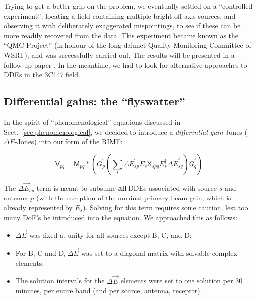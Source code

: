 \documentclass[]{aa}
\newcommand{\jones}[2]{\vec {#1}_{#2}}
\newcommand{\jonesT}[2]{\vec {#1}^\dagger_{#2}}
\newcommand{\coh}[2]{\mathsf{{#1}}_{{#2}}}
\begin{document}
Trying to get a better grip on the problem, we eventually settled on a ``controlled experiment'':
locating a field containing multiple bright off-axis sources, and observing it with deliberately exaggerated mispointings, to see if these can be more readily recovered from the data. This experiment became known as the ``QMC Project'' (in honour of the long-defunct Quality Monitoring Committee of WSRT), and was successfully carried out. The results will be presented in a follow-up paper \citep{QMC}. 
In the meantime, we had to look for alternative approaches to DDEs in the 3C147 field.

\subsection{Differential gains: the ``flyswatter''\label{sec:diffgains}}

In the spirit of ``phenomenological'' equations discussed in Sect.~\ref{sec:phenomenological}, we decided to introduce a {\em differential gain} Jones ($\Delta E$-Jones) into our form of the RIME:

\begin{equation}\label{eq:3C147:de}
\coh{V}{pq} = \coh{M}{pq} \ast \left ( \jones{G}{p} \left( \sum_s \Delta\jones{E}{sp} E_s \coh{X}{spq} E^{\dagger}_s \Delta\jonesT{E}{sq} \right)  \jonesT{G}{q} \right )
\end{equation}

The $\Delta\jones{E}{sp}$ term is meant to subsume {\bf all} DDEs associated with source $s$ and antenna $p$ (with the exception of the nominal primary beam gain, which is already represented by $E_s$). Solving for this term requires some caution, lest too many DoF's be introduced into the equation. We approached this as follows:

\begin{itemize}
\item $\Delta\jones{E}{}$ was fixed at unity for all sources except B, C, and D;
\item For B, C and D, $\Delta\jones{E}{}$ was set to a diagonal matrix with solvable complex elements.
\item The solution intervals for the $\Delta\jones{E}{}$ elements were set to one solution per 30 minutes, per entire band (and per source, antenna, receptor).
\end{itemize}
\end{document}

